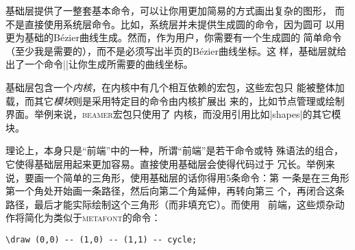\begin{description}
  基础层提供了一整套基本命令，可以让你用更加简易的方式画出复杂的图形，
  而不是直接使用系统层命令。比如，系统层并未提供生成圆的命令，因为圆可
  以用更为基础的B\'ezier曲线生成。然而，作为用户，你需要有一个生成圆的
  简单命令（至少我是需要的），而不是必须写出半页的B\'ezier曲线坐标。这
  样，基础层就给出了一个命令|\pgfpathcircle|让你生成所需要的曲线坐标。


  基础层包含一个\emph{内核}，在内核中有几个相互依赖的宏包，这些宏包只
  能被整体加载，而其它\emph{模块}则是采用特定目的命令由内核扩展出
  来的，比如节点管理或绘制界面。举例来说，\textsc{beamer}宏包只使用了
  内核，而没用引用比如|shapes|的其它模块。

\end{description}  


理论上，\tikzname 本身只是“前端”中的一种，所谓“前端”是若干命令或特
殊语法的组合，它使得基础层用起来更加容易。直接使用基础层会使得代码过于
冗长。举例来说，要画一个简单的三角形，使用基础层的话你得用5条命令：第
一条是在三角形第一个角处开始画一条路径，然后向第二个角延伸，再转向第三
个，再闭合这条路径，最后才能实际绘制这个三角形（而非填充它）。而使用
\tikzname\ 前端，这些烦杂动作将简化为类似于\textsc{metafont}的命令：

\begin{verbatim}
\draw (0,0) -- (1,0) -- (1,1) -- cycle;
\end{verbatim}

